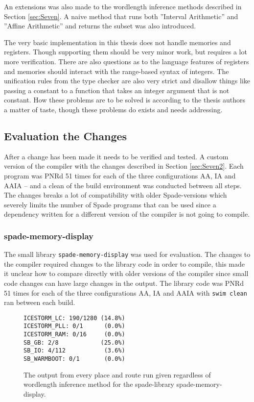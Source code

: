 An extensions was also made to the wordlength inference methods described in Section \ref{sec:Seven}. A naive method that runs both ''Interval Arithmetic'' and ''Affine Arithmetic'' and returns the subset was also introduced.

The very basic implementation in this thesis does not handle memories and registers. Though supporting them should be very minor work, but requires a lot more verification. There are also questions as to the language features of registers and memories should interact with the range-based syntax of integers. The unification rules from the type checker are also very strict and disallow things like passing a constant to a function that takes an integer argument that is not constant. How these problems are to be solved is according to the thesis authors a matter of taste, though these problems do exists and needs addressing. 

\subsection{Evaluation the Changes}
After a change has been made it needs to be verified and tested. A custom version of the compiler with the changes described in Section \ref{sec:Seven2}. Each program was PNRd 51 times for each of the three configurations AA, IA and AAIA -- and a clean of the build environment was conducted between all steps. The changes breaks a lot of compatibility with older Spade-versions which severely limits the number of Spade programs that can be used since a dependency written for a different version of the compiler is not going to compile.

\subsubsection{spade-memory-display}
The small library \verb+spade-memory-display+ was used for evaluation. The changes to the compiler required changes to the library code in order to compile, this made it unclear how to compare directly with older versions of the compiler since small code changes can have large changes in the output. The library code was PNRd 51 times for each of the three configurations AA, IA and AAIA with \verb+swim clean+ ran between each build.
 
\begin{figure}
\begin{center}
\begin{verbatim}
ICESTORM_LC: 190/1280 (14.8%)
ICESTORM_PLL: 0/1      (0.0%)
ICESTORM_RAM: 0/16     (0.0%)
SB_GB: 2/8            (25.0%)
SB_IO: 4/112           (3.6%)
SB_WARMBOOT: 0/1       (0.0%)
\end{verbatim}
\end{center}

  \caption{The output from every place and route run given regardless of wordlength inference method for the spade-library spade-memory-display.}
  \label{fig:SMDoutput}
\end{figure}

